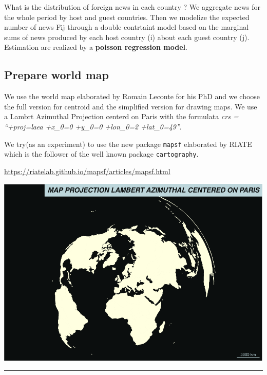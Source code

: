 \documentclass[
]{article}
\begin{document}
What is the distribution of foreign news in each country ? We aggregate
news for the whole period by host and guest countries. Then we modelize
the expected number of news Fij through a double contrtaint model based
on the marginal sums of news produced by each host country (i) about
each guest country (j). Estimation are realized by a \textbf{poisson
regression model}.

\hypertarget{prepare-world-map}{%
\subsection{Prepare world map}\label{prepare-world-map}}

We use the world map elaborated by Romain Leconte for his PhD and we
choose the full version for centroid and the simplified version for
drawing maps. We use a Lambrt Azimuthal Projection centerd on Paris with
the formulata \emph{crs = ``+proj=laea +x\_0=0 +y\_0=0 +lon\_0=2
+lat\_0=49''}.

We try(as an experiment) to use the new package \texttt{mapsf}
elaborated by RIATE which is the follower of the well known package
\texttt{cartography}.

\url{https://riatelab.github.io/mapsf/articles/mapsf.html}

\includegraphics{Part2_maps_files/figure-latex/unnamed-chunk-4-1.pdf}

\begin{center}\rule{0.5\linewidth}{0.5pt}\end{center}
\end{document}
